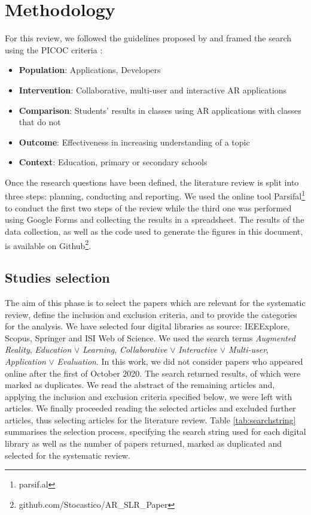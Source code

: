 
\section{Methodology}\label{sec:methods}
For this review, we followed the guidelines proposed by \citet{kitchenham2009systematic} and framed the search using the PICOC criteria \citep{petticrew2008systematic}:
\begin{itemize}
    \item \textbf{Population}: Applications, Developers
    \item \textbf{Intervention}: Collaborative, multi-user and interactive \gls{AR} applications
    \item \textbf{Comparison}: Students' results in classes using AR applications with classes that do not
    \item \textbf{Outcome}: Effectiveness in increasing understanding of a topic
    \item \textbf{Context}: Education, primary or secondary schools
\end{itemize}

Once the research questions have been defined, the literature review is split into three steps: planning, conducting and reporting. We used the online tool Parsifal\footnote{parsif.al} to conduct the first two steps of the review while the third one was performed using Google Forms and collecting the results in a spreadsheet. The results of the data collection, as well as the code used to generate the figures in this document, is available on Github\footnote{github.com/Stocastico/AR\_SLR\_Paper}.

\subsection{Studies selection}
The aim of this phase is to select the papers which are relevant for the systematic review, define the inclusion and exclusion criteria, and to provide the categories for the analysis.
We have selected four digital libraries as source: IEEExplore, Scopus, Springer and ISI Web of Science. We used the search terms \emph{Augmented Reality}, \emph{Education} $\lor$ \emph{Learning}, \emph{Collaborative} $\lor$ \emph{Interactive} $\lor$ \emph{Multi-user}, \emph{Application} $\lor$ \emph{Evaluation}. In this work, we did not consider papers who appeared online after the first of October 2020. The search returned \allPapers results, of which \duplPapers were marked as duplicates. We read the abstract of the remaining \papersCheckAbstract articles and, applying the inclusion and exclusion criteria specified below, we were left with \papersToRead articles. We finally proceeded reading the selected articles and excluded \papersExludedAfterReading further articles, thus selecting \papersSelected articles for the literature review.
Table \ref{tab:searchstring} summarises the selection process, specifying the search string used for each digital library as well as the number of papers returned, marked as duplicated and selected for the systematic review.

